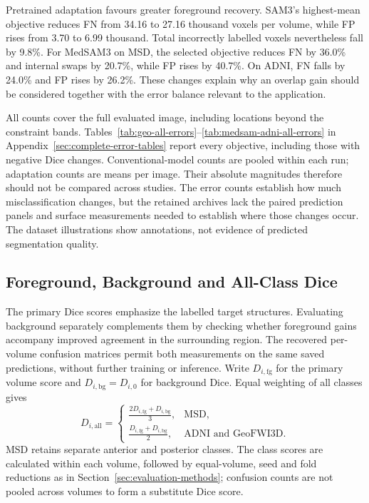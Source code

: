 \documentclass[12pt,a4paper]{article}
\begin{document}
Pretrained adaptation favours greater foreground recovery. SAM3's
highest-mean objective reduces FN from 34.16 to 27.16 thousand voxels
per volume, while FP rises from 3.70 to 6.99 thousand. Total incorrectly
labelled voxels nevertheless fall by 9.8\%. For MedSAM3 on MSD, the
selected objective reduces FN by 36.0\% and internal swaps by 20.7\%,
while FP rises by 40.7\%. On ADNI, FN falls by 24.0\% and FP rises
by 26.2\%. These changes explain why an overlap gain should be considered
together with the error balance relevant to the application.

All counts cover the full evaluated image, including locations beyond
the constraint bands. Tables~\ref{tab:geo-all-errors}--\ref{tab:medsam-adni-all-errors}
in Appendix~\ref{sec:complete-error-tables} report every objective, including
those with negative Dice changes. Conventional-model counts are pooled
within each run; adaptation counts are means per image. Their absolute
magnitudes therefore should not be compared across studies. The error
counts establish how much misclassification changes, but the retained archives lack the paired
prediction panels and surface measurements needed to establish where
those changes occur. The dataset illustrations show annotations,
not evidence of predicted segmentation quality.

\FloatBarrier
\FloatBarrier
\subsection{Foreground, Background and All-Class Dice}
\label{sec:background-dice-results}

The primary Dice scores emphasize the labelled target structures.
Evaluating background separately complements them by checking whether
foreground gains accompany improved agreement in the surrounding region.
The recovered per-volume confusion matrices permit both measurements
on the same saved predictions, without further training or inference.
Write $D_{i,\mathrm{fg}}$ for the primary volume score and
$D_{i,\mathrm{bg}}=D_{i,0}$ for background Dice. Equal weighting of
all classes gives
\begin{equation}
D_{i,\mathrm{all}}=
\begin{cases}
\displaystyle\frac{2D_{i,\mathrm{fg}}+D_{i,\mathrm{bg}}}{3},
 & \text{MSD},\\[.6em]
\displaystyle\frac{D_{i,\mathrm{fg}}+D_{i,\mathrm{bg}}}{2},
 & \text{ADNI and GeoFWI3D}.
\end{cases}
\label{eq:reported-all-class-dice}
\end{equation}
MSD retains separate anterior and posterior classes. The class scores
are calculated within each volume, followed by equal-volume, seed and
fold reductions as in Section~\ref{sec:evaluation-methods}; confusion
counts are not pooled across volumes to form a substitute Dice score.
\end{document}
